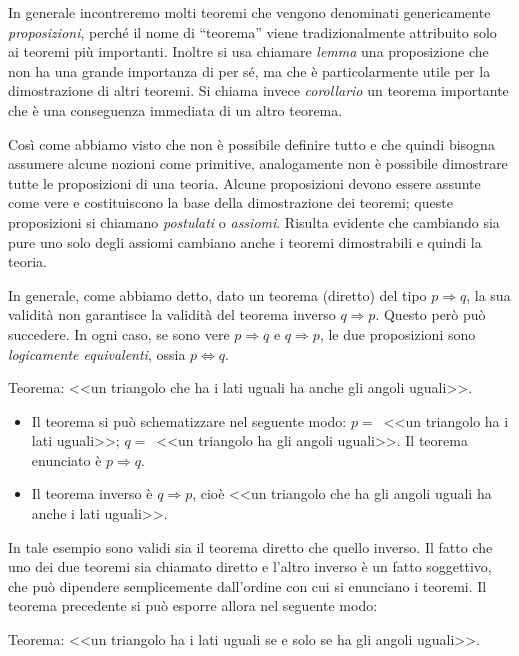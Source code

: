 In generale incontreremo molti teoremi che vengono denominati genericamente \emph{proposizioni}, perché il nome di ``teorema'' viene tradizionalmente attribuito solo ai teoremi più importanti. Inoltre si usa chiamare \emph{lemma} una proposizione che non ha una grande importanza di per sé, ma che è particolarmente utile per la dimostrazione di altri teoremi. Si chiama invece \emph{corollario} un teorema importante che è una conseguenza immediata di un altro teorema.

Così come abbiamo visto che non è possibile definire tutto e che quindi bisogna assumere alcune nozioni come primitive, analogamente non è possibile dimostrare tutte le proposizioni di una teoria. Alcune proposizioni devono essere assunte come vere e costituiscono la base della dimostrazione dei teoremi; queste proposizioni si chiamano \emph{postulati} o \emph{assiomi}. Risulta evidente che cambiando sia pure uno solo degli assiomi cambiano anche i teoremi dimostrabili e quindi la teoria.

In generale, come abbiamo detto, dato un teorema (diretto) del tipo $p\Rightarrow q$, la sua validità non garantisce la validità del teorema inverso $q\Rightarrow p$. Questo però può succedere. In ogni caso, se sono vere $p\Rightarrow q$ e $q\Rightarrow p$, le due proposizioni sono \emph{logicamente equivalenti}, ossia $p\Leftrightarrow q$.
\begin{exrig}
\begin{esempio}
Teorema: <<un triangolo che ha i lati uguali ha anche gli angoli uguali>>.
\begin{itemize}
\item Il teorema si può schematizzare nel seguente modo: $p=$~<<un triangolo ha i lati uguali>>; $q=$~<<un triangolo ha gli angoli uguali>>. Il teorema enunciato è $p\Rightarrow q$.
\item  Il teorema inverso è  $q\Rightarrow p$, cioè <<un triangolo che ha gli angoli uguali ha anche i lati uguali>>.
\end{itemize}
In tale esempio sono validi sia il teorema diretto che quello inverso. Il fatto che uno dei due teoremi sia chiamato diretto e l'altro inverso è un fatto soggettivo, che può dipendere semplicemente dall'ordine con cui si enunciano i teoremi.
Il teorema precedente si può esporre allora nel seguente modo:
\item Teorema: <<un triangolo ha i lati uguali se e solo se ha gli angoli uguali>>.
\end{esempio}
\end{exrig}

